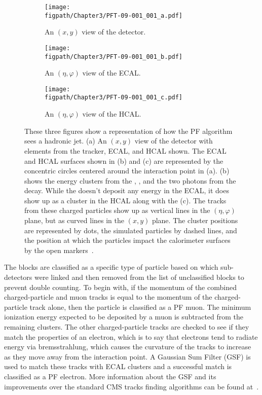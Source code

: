 \begin{figure}[!hbt]
    \centering
    \begin{subfigure}[t]{0.53\textwidth}
        \texttt{[image: \\figpath/Chapter3/PFT-09-001\_001\_a.pdf]}
        \caption{An $(x,y)$ view of the detector.}
        \label{fig:PF_linking_a}
    \end{subfigure}

    \begin{subfigure}[t]{0.4655\textwidth}
        \texttt{[image: \\figpath/Chapter3/PFT-09-001\_001\_b.pdf]}
        \caption{An $(\eta,\varphi)$ view of the ECAL.}
        \label{fig:PF_linking_b}
    \end{subfigure}
    \begin{subfigure}[t]{0.4655\textwidth}
        \texttt{[image: \\figpath/Chapter3/PFT-09-001\_001\_c.pdf]}
        \caption{An $(\eta,\varphi)$ view of the HCAL.}
        \label{fig:PF_linking_c}
    \end{subfigure}
    \caption{These three figures show a representation of how the PF algorithm sees a hadronic jet. (a) An $(x,y)$ view of the detector with elements from the tracker, ECAL, and HCAL shown. The ECAL and HCAL surfaces shown in (b) and (c) are represented by the concentric circles centered around the interaction point in (a). (b) shows the energy clusters from the \PKzL, \Pgpm, and the two photons from the \Pgpz decay. While the \Pgpp doesn't deposit any energy in the ECAL, it does show up as a cluster in the HCAL along with the \Pgpm (c). The tracks from these charged particles show up as vertical lines in the $(\eta,\varphi)$ plane, but as curved lines in the $(x,y)$ plane. The cluster positions are represented by dots, the simulated particles by dashed lines, and the position at which the particles impact the calorimeter surfaces by the open markers~\cite{CMS-PAS-PFT-09-001}.}
    \label{fig:PF_linking}
\end{figure}

\clearpage

The blocks are classified as a specific type of particle based on which sub-detectors were linked and then removed from the list of unclassified blocks to prevent double counting.
To begin with, if the momentum of the combined charged-particle and muon tracks is equal to the momentum of the charged-particle track alone, then the particle is classified as a PF muon.
The minimum ionization energy expected to be deposited by a muon is subtracted from the remaining clusters.
The other charged-particle tracks are checked to see if they match the properties of an electron, which is to say that electrons tend to radiate energy via bremsstrahlung, which causes the curvature of the tracks to increase as they move away from the interaction point.
A Gaussian Sum Filter (GSF) is used to match these tracks with ECAL clusters and a successful match is classified as a PF electron.
More information about the GSF and its improvements over the standard CMS tracks finding algorithms can be found at~\cite{ElectronGSF}.

